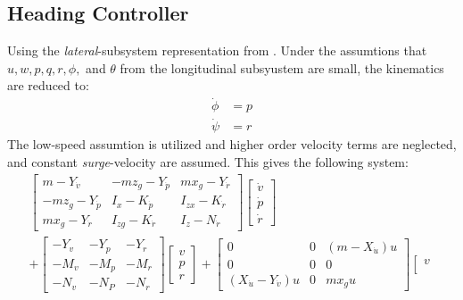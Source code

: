 	\subsection{Heading Controller}
		Using the \textit{lateral}-subsystem representation from \cite{fossen}. Under the assumtions
		that $u, w, p, q, r, \phi,$ and $\theta$ from the longitudinal subsyustem are small, the
		kinematics are reduced to:
		\begin{align}
			\dot{\phi} &= p \\
			\dot{\psi} &= r 
		\end{align}
		The low-speed assumtion is utilized and higher order velocity terms are neglected, and
		constant \textit{surge}-velocity are assumed. This gives the following system:
		\begin{equation}
			\begin{aligned}
				\left [ \begin{array}{ccc}
					m - Y_{\dot{v}} & - m z_g - Y_{\dot{p}} & m x_g - Y_{\dot{r}} \\
					-m z_g - Y_{\dot{p}} & I_x - K_{\dot{p}} & I_{zx} - K_{\dot{r}} \\
					m x_g - Y_{\dot{r}} & I_{zg} - K_{\dot{r}} & I_z - N_{\dot{r}} 
					\end{array} \right]
				\left [ \begin{array}{c}
					\dot{v} \\
					\dot{p} \\
					\dot{r} 
					\end{array} \right] \\
				+ \left [ \begin{array}{ccc}
					-Y_v	&	-Y_p 	&	-Y_r \\
					-M_v	&	-M_p	&	-M_r \\
					-N_v	&	-N_P	&	-N_r
					\end{array} \right]
				\left [ \begin{array}{c}
					v \\
					p \\
					r 
				\end{array} \right] + 
				\left [ \begin{array}{ccc} 
					0 & 0 & (m - X_{\dot{u}})u \\
					0 & 0 &  0 \\
					(X_{\dot{u}} - Y_{\dot{v}}) u & 0 & m x_g u 
					\end{array} \right]	
				\left [ \begin{array}{c}
					v \\

\end{array}
\end{aligned}
\end{equation}
